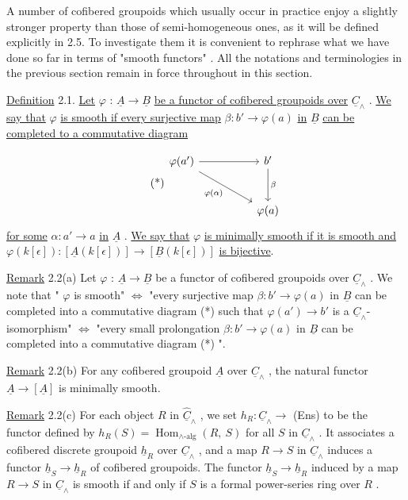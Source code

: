 A number of cofibered groupoids which usually occur in practice enjoy a slightly stronger property than those of semi-homogeneous ones, as it will be defined explicitly in 2.5. To investigate them it is convenient to rephrase what we have done so far in terms of  "smooth functors" . All the notations and terminologies in the previous section remain in force throughout in this section.

\underline{Definition} 2.1.  \underline{Let}  $\varphi$ : $\underline{A} \longrightarrow \underline{B}$  \underline{be a functor of cofibered groupoids over}  $\underline{C}_\wedge$ . \underline{We say that}  $\varphi$  \underline{is smooth if every surjective map}  $\beta : b' \longrightarrow \varphi(a)$  \underline{in}  $\underline{B}$  \underline{can be completed to a commutative diagram}

\begin{equation}\tag{*}
\begin{tikzcd}[row sep=large, column sep=huge]
\varphi(a') \arrow[r] \arrow[dr, "\varphi(\alpha)"'] & b' \arrow[d, "\beta"] \\
 & \varphi(a)
\end{tikzcd}
\end{equation}
\underline{for some}  $\alpha : a' \longrightarrow a$  \underline{in}  $\underline{A}$ . \underline{We say that}  $\varphi$  \underline{is minimally smooth if it is smooth and}  $\varphi(k[\epsilon]) : [\underline{A}(k[\epsilon])] \longrightarrow [\underline{B}(k[\epsilon])]$  \underline{is bijective}.

\underline{Remark} 2.2(a)  Let  $\varphi$ : $\underline{A} \longrightarrow \underline{B}$  be a functor of cofibered groupoids over  $\underline{C}_\wedge$ . We note that  " $\varphi$  is smooth" $\Leftrightarrow$ "every surjective map  $\beta : b' \longrightarrow \varphi(a)$  in  $\underline{B}$ can be completed into a commutative diagram (*) such that  $\varphi(a') \longrightarrow b'$  is a $\underline{C}_\wedge$-isomorphism"  $\Leftrightarrow$  "every small prolongation  $\beta : b' \longrightarrow \varphi(a)$  in  $\underline{B}$  can be completed into a commutative diagram (*) ".

\underline{Remark} 2.2(b)  For any cofibered groupoid  $\underline{A}$  over  $\underline{C}_\wedge$ , the natural functor $\underline{A} \longrightarrow [\underline{A}]$  is minimally smooth.

\underline{Remark} 2.2(c)  For each object  $R$  in  $\hat{\underline{C}}_\wedge$ , we set  $h_R : \underline{C}_\wedge \longrightarrow$ (Ens)  to be the functor defined by  $h_R(S) = \operatorname{Hom}_{\wedge\text{-alg}}(R,\ S)$  for all  $S$  in  $\underline{C}_\wedge$ . It associates a cofibered discrete groupoid  $\underline{h}_R$  over  $\underline{C}_\wedge$ , and a map  $R \longrightarrow S$  in  $\underline{C}_\wedge$
induces a functor  $\underline{h}_S \longrightarrow \underline{h}_R$  of cofibered groupoids. The functor  $\underline{h}_S \longrightarrow \underline{h}_R$  induced by a map  $R \longrightarrow S$  in  $\underline{C}_\wedge$  is smooth if and only if  $S$  is a formal power-series ring over  $R$ .

